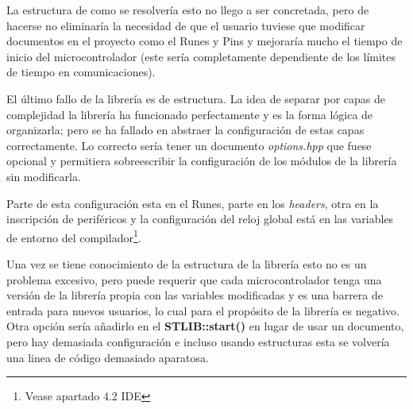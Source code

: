 \documentclass{report}
\begin{document}
La estructura de como se resolvería esto no llego a ser concretada, pero de hacerse no eliminaría la necesidad de que el usuario tuviese que modificar documentos en el proyecto como el Runes y Pins y mejoraría mucho el tiempo de inicio del microcontrolador (este sería completamente dependiente de los límites de tiempo en comunicaciones). 
\par \vspace{0.3cm}
El último fallo de la librería es de estructura. La idea de separar por capas de complejidad la librería ha funcionado perfectamente y es la forma lógica de organizarla; pero se ha fallado en abstraer la configuración de estas capas correctamente. Lo correcto sería tener un documento \textit{options.hpp} que fuese opcional y permitiera sobreescribir la configuración de los módulos de la librería sin modificarla. \par
Parte de esta configuración esta en el Runes, parte en los \textit{headers}, otra en la inscripción de periféricos y la configuración del reloj global está en las variables de entorno del compilador\footnote{Vease apartado 4.2 IDE}. 
\par
Una vez se tiene conocimiento de la estructura de la librería esto no es un problema excesivo, pero puede requerir que cada microcontrolador tenga una versión de la librería propia con las variables modificadas y es una barrera de entrada para nuevos usuarios, lo cual para el propósito de la librería es negativo. Otra opción sería añadirlo en el \textbf{STLIB::start()} en lugar de usar un documento, pero hay demasiada configuración e incluso usando estructuras esta se volvería una linea de código demasiado aparatosa. 

\newpage
\end{document}
